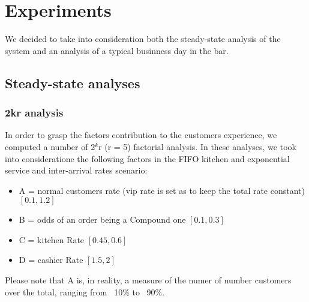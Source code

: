 \section{Experiments}


We decided to take into consideration both the steady-state analysis of the 
system and an analysis of a typical businness day in the bar.

\subsection{Steady-state analyses}

\subsubsection{2kr analysis}
In order to grasp the factors contribution to the customers experience, we computed a number of 2$^k$r (r = 5) factorial analysis. In these analyses, we took into 
consideratione the following factors in the FIFO kitchen and exponential service and inter-arrival rates scenario: 
\begin{itemize}
  \item A = normal customers rate (vip rate is set as to keep the total rate constant) $[0.1, 1.2]$
  \item B = odds of an order being a Compound one $[0.1, 0.3]$
  \item C = kitchen Rate $[0.45, 0.6]$
  \item D = cashier Rate $[1.5, 2]$
\end{itemize}
Please note that A is, in reality, a measure of the numer of number customers 
over the total, ranging from ~10\% to ~90\%.

